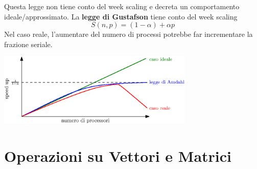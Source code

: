 \documentclass[10pt, letterpaper]{report}
\begin{document}
Questa legge non tiene conto del week scaling e decreta un comportamento ideale/approssimato. La \textbf{legge 
di Gustafson} tiene conto del week scaling 
$$ S(n,p)=(1-\alpha)+\alpha p$$
Nel caso reale, l'aumentare del numero di processi potrebbe far incrementare la frazione seriale.\begin{center}
    \includegraphics[width=0.7\textwidth]{images/speedUp.eps}
\end{center}
\flowerLine
\section{Operazioni su Vettori e Matrici}
\end{document}
